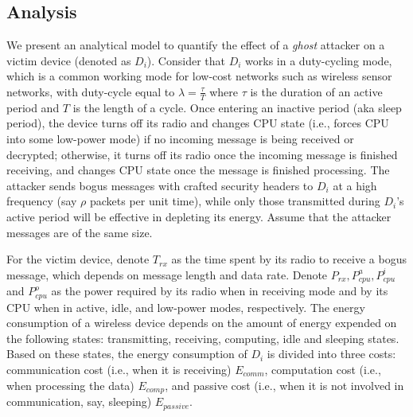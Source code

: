 \documentclass[10pt,journal,cspaper,compsoc]{IEEEtran}
\begin{document}
\subsection{Analysis}\label{sec:analysis}
We present an analytical model to quantify the effect of a {\em ghost} attacker on a victim device (denoted as $D_i$). Consider that $D_i$ works in a duty-cycling mode, which is a common working mode for low-cost networks such as wireless sensor networks, with duty-cycle equal to $\lambda=\frac{\tau}{T}$ where $\tau$ is the duration of an active period and $T$ is the length of a cycle. Once entering an inactive period (aka sleep period), the device turns off its radio and changes CPU state (i.e., forces CPU into some low-power mode) if no incoming message is being received or decrypted; otherwise, it turns off its radio once the incoming message is finished receiving, and changes CPU state once the message is finished processing. The attacker sends bogus messages with crafted security headers to $D_i$ at a high frequency (say $\rho$ packets per unit time), while only those transmitted during $D_i$'s active period will be effective in depleting its energy. Assume that the attacker messages are of the same size.

For the victim device, denote $T_{rx}$ as the time spent by its radio to receive a bogus message, which depends on message length and data rate. Denote $P_{rx}, P^a_{cpu}, P^i_{cpu}$ and $P^o_{cpu}$ as the power required by its radio when in receiving mode and by its CPU when in active, idle, and low-power modes, respectively. The energy consumption of a wireless device depends on the amount of energy expended on the following states: transmitting, receiving, computing, idle and sleeping states. Based on these states, the energy consumption of $D_i$ is divided  into three costs: communication cost (i.e., when it is receiving) $E_{comm}$, computation cost (i.e., when processing the data) $E_{comp}$, and passive cost (i.e., when it is not involved in communication, say, sleeping) $E_{passive}$.
\end{document}
